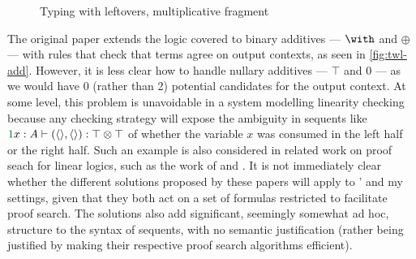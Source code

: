 \begin{figure}
  \caption{Typing with leftovers, multiplicative fragment}
  \label{fig:twl-mult}
\end{figure}

The original paper extends the logic covered to binary additives --- $\with$ and
$\oplus$ --- with rules that check that terms agree on output contexts, as seen
in \cref{fig:twl-add}.
However, it is less clear how to handle nullary additives --- $\top$ and $0$ ---
as we would have 0 (rather than 2) potential candidates for the output context.
At some level, this problem is unavoidable in a system modelling linearity
checking because any checking strategy will expose the ambiguity in sequents
like $\gr1x : A \vdash (\langle\rangle, \langle\rangle) : \top \otimes \top$ of
whether the variable
$x$ was consumed in the left half or the right half.
Such an example is also considered in related work on proof seach for linear
logics, such as the work of \citet[p.\ 11]{WH94} and \citet[p.\ 150]{CHP00}.
It is not immediately clear whether the different solutions proposed by these
papers will apply to \citeauthor{allais17}' and my settings, given that they
both act on a set of formulas restricted to facilitate proof search.
The solutions also add significant, seemingly somewhat ad hoc, structure to the
syntax of sequents, with no semantic justification (rather being justified by
making their respective proof search algorithms efficient).

